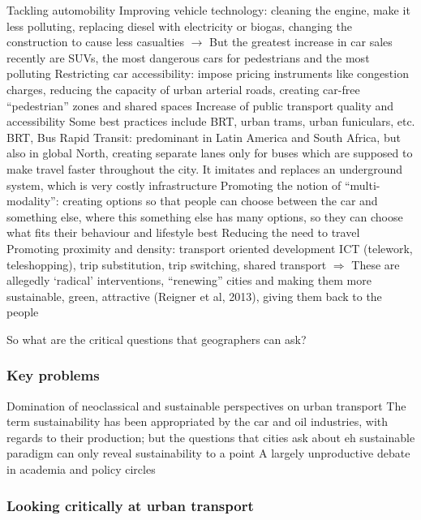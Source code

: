 \documentclass{article}
\begin{document}
\begin{outline}
	\1 Tackling automobility
		\2 Improving vehicle technology: cleaning the engine, make it less polluting, replacing diesel with electricity or biogas, changing the construction to cause less casualties $\rightarrow$ But the greatest increase in car sales recently are SUVs, the most dangerous cars for pedestrians and the most polluting
		\2 Restricting car accessibility: impose pricing instruments like congestion charges, reducing the capacity of urban arterial roads, creating car-free ``pedestrian'' zones and shared spaces
		\2 Increase of public transport quality and accessibility
			\3 Some best practices include BRT, urban trams, urban funiculars, etc.
			\3 BRT, Bus Rapid Transit: predominant in Latin America and South Africa, but also in global North, creating separate lanes only for buses which are supposed to make travel faster throughout the city. It imitates and replaces an underground system, which is very costly infrastructure
		\2  Promoting the notion of ``multi-modality'': creating options so that people can choose between the car and something else, where this something else has many options, so they can choose what fits their behaviour and lifestyle best
	\1 Reducing the need to travel
		\2 Promoting proximity and density: transport oriented development
		\2 ICT (telework, teleshopping), trip substitution, trip switching, shared transport
		\2 $\Rightarrow$ These are allegedly `radical' interventions, ``renewing'' cities and making them more sustainable, green, attractive (Reigner et al, 2013), giving them back to the people
\end{outline}

So what are the critical questions that geographers can ask?

\subsubsection{Key problems}

\begin{outline}
	\1 Domination of neoclassical and sustainable perspectives on urban transport
		\2 The term sustainability has been appropriated by the car and oil industries, with regards to their production; but the questions that cities ask about eh sustainable paradigm can only reveal sustainability to a point
		\2 A largely unproductive debate in academia and policy circles
\end{outline}

\subsubsection{Looking critically at urban transport}
\end{document}
